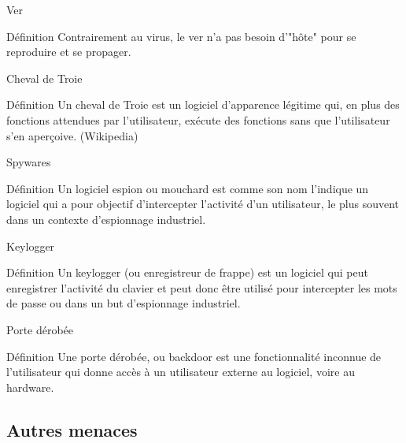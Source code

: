 \documentclass[12pt]{beamer}
\begin{document}
		\begin{frame}{Ver}
			\begin{exampleblock}{Définition}
						Contrairement au virus, le \alert{ver} n'a pas besoin d'"hôte" pour se reproduire et se propager. 
				\end{exampleblock}		
		\end{frame}
		
		\begin{frame}{Cheval de Troie}
			\begin{exampleblock}{Définition}
						Un \alert{cheval de Troie} est un logiciel d'apparence légitime qui, en plus des fonctions attendues par l'utilisateur, exécute des fonctions sans que l'utilisateur s'en aperçoive. (Wikipedia)
				\end{exampleblock}		
		\end{frame}
		
		\begin{frame}{Spywares}
			\begin{exampleblock}{Définition}
						Un \alert{logiciel espion} ou \alert{mouchard} est comme son nom l'indique un  logiciel qui a pour objectif d'intercepter l'activité d'un utilisateur, le plus souvent dans un contexte d'espionnage industriel.
				\end{exampleblock}		
		\end{frame}		
		
		\begin{frame}{Keylogger}
			\begin{exampleblock}{Définition}
						Un \alert{keylogger} (ou enregistreur de frappe) est un logiciel qui peut enregistrer l'activité du clavier et peut donc être utilisé pour intercepter les mots de passe ou dans un but d'espionnage industriel.
				\end{exampleblock}		
		\end{frame}
		
		\begin{frame}{Porte dérobée}
			\begin{exampleblock}{Définition}
					Une \alert{porte dérobée}, ou \alert{backdoor} est une fonctionnalité inconnue de l'utilisateur qui donne accès à un utilisateur externe au logiciel, voire au hardware.
			\end{exampleblock}		
		\end{frame}
	
	\subsection{Autres menaces}
	
\end{document}
